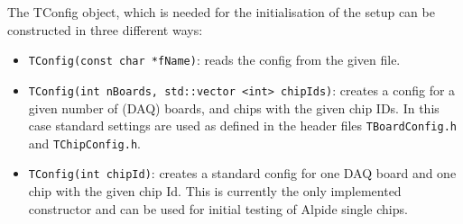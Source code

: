 \documentclass{article}
\begin{document}
The TConfig object, which is needed for the initialisation of the
setup can be constructed in three different ways: 

\begin{itemize}
\item \texttt{TConfig(const char *fName)}: reads the config from the
    given file.
\item \texttt{TConfig(int nBoards, std::vector <int> chipIds)}:
  creates a config for a given number of (DAQ) boards, and chips with the
  given chip IDs. In this case standard settings are used as defined
  in the header files \texttt{TBoardConfig.h} and
  \texttt{TChipConfig.h}.
\item \texttt{TConfig(int chipId)}: creates a standard config for one
  DAQ board and one chip with the given chip Id. This is currently the
  only implemented constructor and can be used for initial testing of
  Alpide single chips.
\end{itemize}
\end{document}
